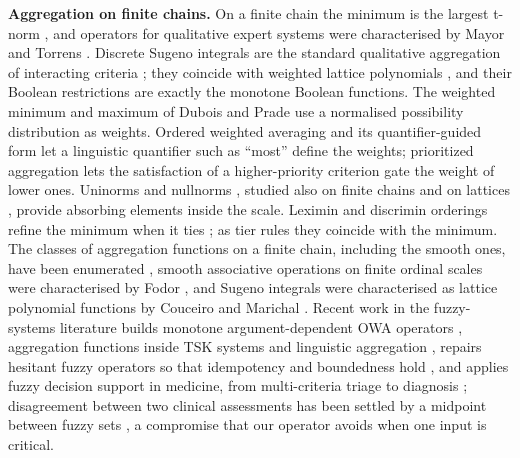 \documentclass[11pt,a4paper]{article}%
\begin{document}
\textbf{Aggregation on finite chains.} On a finite chain the minimum is the largest t-norm \cite{mayor2005discrete}, and operators for qualitative expert systems were characterised by Mayor and Torrens \cite{mayor1993class}. Discrete Sugeno integrals are the standard qualitative aggregation of interacting criteria \cite{marichal2001axiomatic,marichal2000sugeno}; they coincide with weighted lattice polynomials \cite{marichal2009weighted}, and their Boolean restrictions are exactly the monotone Boolean functions. The weighted minimum and maximum of Dubois and Prade \cite{dubois1986weighted} use a normalised possibility distribution as weights. Ordered weighted averaging \cite{yager1988ordered} and its quantifier-guided form \cite{yager1996quantifier} let a linguistic quantifier such as ``most'' define the weights; prioritized aggregation \cite{yager2008prioritized} lets the satisfaction of a higher-priority criterion gate the weight of lower ones. Uninorms and nullnorms \cite{calvo2001functional}, studied also on finite chains \cite{mas1999t} and on lattices \cite{zhang2021constructions}, provide absorbing elements inside the scale. Leximin and discrimin orderings refine the minimum when it ties \cite{dubois1996refinements}; as tier rules they coincide with the minimum. The classes of aggregation functions on a finite chain, including the smooth ones, have been enumerated \cite{munar2024survey}, smooth associative operations on finite ordinal scales were characterised by Fodor \cite{fodor2000smooth}, and Sugeno integrals were characterised as lattice polynomial functions by Couceiro and Marichal \cite{couceiro2010characterizations}. Recent work in the fuzzy-systems literature builds monotone argument-dependent OWA operators \cite{bian2024pythagorean}, aggregation functions inside TSK systems \cite{wang2024ensemble} and linguistic aggregation \cite{zhou2024distribution}, repairs hesitant fuzzy operators so that idempotency and boundedness hold \cite{dawlet2024normalized}, and applies fuzzy decision support in medicine, from multi-criteria triage \cite{albahri2023explainable} to diagnosis \cite{pham2023proposed}; disagreement between two clinical assessments has been settled by a midpoint between fuzzy sets \cite{serramoll2025midpoint}, a compromise that our operator avoids when one input is critical.
\end{document}
